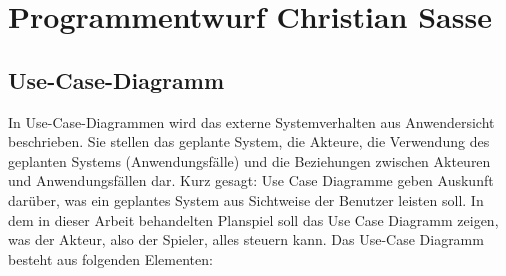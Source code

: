 \section{Programmentwurf \textnormal{\textsf{\small{Christian Sasse}}}}

\subsection{Use-Case-Diagramm}
In Use-Case-Diagrammen wird das externe Systemverhalten aus Anwendersicht beschrieben. Sie stellen das geplante System, die Akteure, die Verwendung des geplanten Systems (Anwendungsfälle) und die Beziehungen zwi­schen Akteuren und Anwendungsfällen dar. Kurz gesagt: Use Case Diagramme geben Auskunft darüber, was ein geplantes System aus Sichtweise der Benutzer leisten soll. In dem in dieser Arbeit behandelten Planspiel soll das Use Case Diagramm zeigen, was der Akteur, also der Spieler, alles steuern kann.
Das Use-Case Diagramm besteht aus folgenden Elementen:

